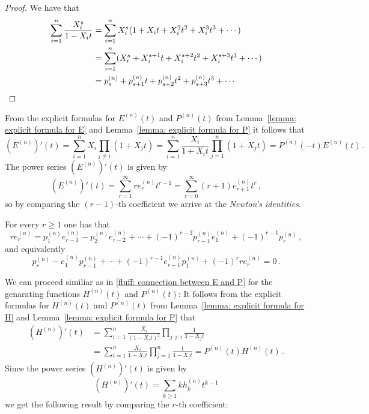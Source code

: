 \begin{proof}
  We have that
  \begin{align*}
        \sum_{i=1}^n \frac{X_i^s}{1-X_i t}
    &=  \sum_{i=1}^n X_i^s (1 + X_i t + X_i^2 t^2 + X_i^3 t^3 + \dotsb) \\
    &=  \sum_{i=1}^n (X_i^s + X_i^{s+1} t + X_i^{s+2} t^2 + X_i^{s+3} t^3 + \dotsb) \\
    &=  p^{(n)}_s + p^{(n)}_{s+1} t + p^{(n)}_{s+2} t^2 + p^{(n)}_{s+3} t^3 + \dotsb
    \qedhere
  \end{align*}
\end{proof}


\begin{fluff}
  \label{fluff: connection between E and P}
  From the explicit formulas for $E^{(n)}(t)$ and $P^{(n)}(t)$ from Lemma~\ref{lemma: explicit formula for E} and Lemma~\ref{lemma: explicit formula for P} it follows that
  \[
      \left( E^{(n)} \right)'(t)
    = \sum_{i=1}^n X_i \prod_{j \neq i} (1 + X_j t)
    = \sum_{i=1}^n \frac{X_i}{1 + X_i t} \prod_{j=1}^n (1 + X_j t)
    = P^{(n)}(-t)E^{(n)}(t) \,.
  \]
  The power series $(E^{(n)})'(t)$ is given by
  \[
      \left( E^{(n)} \right)'(t)
    = \sum_{r=1}^\infty r e^{(n)}_r t^{r-1}
    = \sum_{r=0}^\infty (r+1) e^{(n)}_{r+1} t^r \,,
  \]
  so by comparing the $(r-1)$-th coefficient we arrive at the \emph{Newton’s identities}.
\end{fluff}


\begin{corollary}
  \label{corollary: Newtons identities}
  For every $r \geq 1$ one has that
  \[
      r e^{(n)}_r
    =   p^{(n)}_1 e^{(n)}_{r-1}
      - p^{(n)}_2 e^{(n)}_{r-2}
      + \dotsb
      + (-1)^{r-2}  p^{(n)}_{r-1} e^{(n)}_1
      + (-1)^{r-1}  p^{(n)}_r \,,
  \]
  and equivalently
  \[
        p^{(n)}_r
      - e^{(n)}_1 p^{(n)}_{r-1}
      + \dotsb
      + (-1)^{r-1} e^{(n)}_{r-1} p^{(n)}_1
      + (-1)^r r e^{(n)}_r
    = 0 \,.
  \]
\end{corollary}


\begin{fluff}
  We can proceed similiar as in \ref{fluff: connection between E and P} for the genarating functions $H^{(n)}(t)$ and $P^{(n)}(t)$:
  It follows from the explicit formulas for $H^{(n)}(t)$ and $P^{(n)}(t)$ from Lemma~\ref{lemma: explicit formula for H} and Lemma~\ref{lemma: explicit formula for P} that
  \begin{align*}
        \left( H^{(n)} \right)'(t)
    &=  \sum_{i=1}^n \frac{X_i}{(1-X_i t)^2} \prod_{j \neq i} \frac{1}{1 - X_j t} \\
    &=  \sum_{i=1}^n \frac{X_i}{1 - X_i t} \prod_{j=1}^n \frac{1}{1 - X_j t}
     =  P^{(n)}(t) H^{(n)}(t) \,.
  \end{align*}
  Since the power series $(H^{(n)})'(t)$ is given by
  \[
      \left( H^{(n)} \right)'(t)
    = \sum_{k \geq 1} k h^{(n)}_k t^{k-1}
  \]
  we get the following result by comparing the $r$-th coefficient:
\end{fluff}


